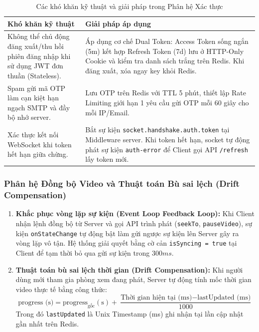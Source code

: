 \documentclass[12pt,a4paper]{extarticle}
\begin{document}
\begin{table}[H]
\centering
\small
\caption{Các khó khăn kỹ thuật và giải pháp trong Phân hệ Xác thực}
\label{tab:auth_problems}
\renewcommand{\arraystretch}{1.35}
\begin{tabular}{|p{5.5cm}|p{8.5cm}|}
\hline
\textbf{Khó khăn kỹ thuật} & \textbf{Giải pháp áp dụng} \\ \hline
Không thể chủ động đăng xuất/thu hồi phiên đăng nhập khi sử dụng JWT đơn thuần (Stateless). & Áp dụng cơ chế Dual Token: Access Token sống ngắn (5m) kết hợp Refresh Token (7d) lưu ở HTTP-Only Cookie và kiểm tra danh sách trắng trên Redis. Khi đăng xuất, xóa ngay key khỏi Redis. \\ \hline
Spam gửi mã OTP làm cạn kiệt hạn ngạch SMTP và đầy bộ nhớ server. & Lưu OTP trên Redis với TTL 5 phút, thiết lập Rate Limiting giới hạn 1 yêu cầu gửi OTP mỗi 60 giây cho mỗi IP/Email. \\ \hline
Xác thực kết nối WebSocket khi token hết hạn giữa chừng. & Bắt sự kiện \texttt{socket.handshake.auth.token} tại Middleware server. Khi token hết hạn, socket tự động phát sự kiện \texttt{auth-error} để Client gọi API \texttt{/refresh} lấy token mới. \\ \hline
\end{tabular}
\end{table}


\subsubsection{Phân hệ Đồng bộ Video và Thuật toán Bù sai lệch (Drift Compensation)}
\begin{enumerate}[leftmargin=1.2cm]
    \item \textbf{Khắc phục vòng lặp sự kiện (Event Loop Feedback Loop):} Khi Client nhận lệnh đồng bộ từ Server và gọi API trình phát (\texttt{seekTo}, \texttt{pauseVideo}), sự kiện \texttt{onStateChange} tự động bật làm gửi ngược sự kiện lên Server gây ra vòng lặp vô tận. Hệ thống giải quyết bằng cờ cản \texttt{isSyncing = true} tại Client để tạm thời bỏ qua gửi sự kiện trong $300ms$.
    \item \textbf{Thuật toán bù sai lệch thời gian (Drift Compensation):} Khi người dùng mới tham gia phòng xem đang phát, Server tự động tính mốc thời gian video thực tế bằng công thức:
    $$\text{progress (s)} = \text{progress}_{\text{gốc}} (\text{s}) + \frac{\text{Thời gian hiện tại (ms)} - \text{lastUpdated (ms)}}{1000}$$
    Trong đó \texttt{lastUpdated} là Unix Timestamp (ms) ghi nhận tại lần cập nhật gần nhất trên Redis.
\end{enumerate}
\end{document}
